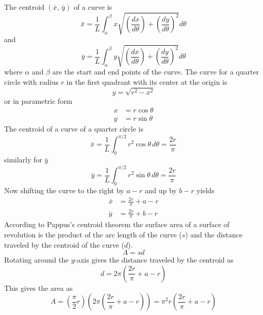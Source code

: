 \documentclass[a4paper,10pt]{article}
\numberwithin{equation}{section}
\begin{document}
The centroid \((\bar{x},\, \bar{y})\) of a curve is
\begin{equation}
\bar{x} = \frac{1}{L} \int_\alpha^\beta x \sqrt{\left( \frac{dx}{d\theta} \right) + \left( \frac{dy}{d\theta} \right)^2} d\theta
\end{equation}
and
\begin{equation}
  \bar{y} = \frac{1}{L} \int_\alpha^\beta y \sqrt{\left( \frac{dx}{d\theta} \right) + \left( \frac{dy}{d\theta} \right)^2} d\theta
\end{equation}
where \(\alpha\) and \(\beta\) are the start and end points of the curve.
The curve for a quarter circle with radius \(r\) in the first quadrant with its center at the origin is
\begin{equation}
  y = \sqrt{r^2 - x^2}
\end{equation}
or in parametric form
\begin{align}
  x &= r\cos{\theta}\\
  y &= r\sin{\theta}
\end{align}
The centroid of a curve of a quarter circle is
\begin{equation}
  \bar{x} = \frac{1}{L} \int_0^{\pi/2} r^2\cos{\theta}\, d\theta = \frac{2r}{\pi}
\end{equation}
similarly for \(\bar{y}\)
\begin{equation}
  \bar{y} = \frac{1}{L} \int_0^{\pi/2} r^2\sin{\theta}\, d\theta = \frac{2r}{\pi}
\end{equation}
Now shifting the curve to the right by \(a - r\) and up by \(b - r\) yields
\begin{align}
  \bar{x} &= \frac{2r}{\pi} + a - r\\
  \bar{y} &= \frac{2r}{\pi} + b - r
\end{align}
According to Pappus's centroid theorem the surface area of a surface of revolution is the product of the arc
length of the curve (\(s\)) and the distance traveled by the centroid of the curve (\(d\)).
\begin{equation}
  A = sd
\end{equation}
Rotating around the \(y\)-axis gives the distance traveled by the centroid as
\begin{equation}
  d = 2\pi \left( \frac{2r}{\pi} + a - r \right)
\end{equation}
This gives the area as
\begin{equation}\label{eq:area_corner}
  A = \left( \frac{\pi}{2} r \right) \left( 2\pi \left( \frac{2r}{\pi} + a - r \right) \right) = \pi^2 r \left( \frac{2r}{\pi} + a - r \right)
\end{equation}
\end{document}
